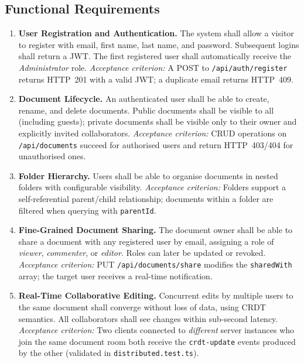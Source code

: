 \documentclass{scrartcl}
\begin{document}
  \subsection{Functional Requirements}

  \begin{enumerate}
    \item[\textbf{FR-1}] \textbf{User Registration and Authentication.}
    The system shall allow a visitor to register with email, first name, last name, and password.
    Subsequent logins shall return a JWT. The first registered user shall automatically receive
    the \textit{Administrator} role.
    \textit{Acceptance criterion:} A POST to \texttt{/api/auth/register} returns HTTP~201 with a
    valid JWT; a duplicate email returns HTTP~409.

    \item[\textbf{FR-2}] \textbf{Document Lifecycle.}
    An authenticated user shall be able to create, rename, and delete documents. Public documents
    shall be visible to all (including guests); private documents shall be visible only to their
    owner and explicitly invited collaborators.
    \textit{Acceptance criterion:} CRUD operations on \texttt{/api/documents} succeed for
    authorised users and return HTTP~403/404 for unauthorised ones.

    \item[\textbf{FR-3}] \textbf{Folder Hierarchy.}
    Users shall be able to organise documents in nested folders with configurable visibility.
    \textit{Acceptance criterion:} Folders support a self-referential parent/child relationship;
    documents within a folder are filtered when querying with \texttt{parentId}.

    \item[\textbf{FR-4}] \textbf{Fine-Grained Document Sharing.}
    The document owner shall be able to share a document with any registered user by email,
    assigning a role of \textit{viewer}, \textit{commenter}, or \textit{editor}. Roles can
    later be updated or revoked.
    \textit{Acceptance criterion:} PUT \texttt{/api/documents/share} modifies the
    \texttt{sharedWith} array; the target user receives a real-time notification.

    \item[\textbf{FR-5}] \textbf{Real-Time Collaborative Editing.}
    Concurrent edits by multiple users to the same document shall converge without loss of data,
    using CRDT semantics. All collaborators shall see changes within sub-second latency.
    \textit{Acceptance criterion:} Two clients connected to \emph{different} server instances who
    join the same document room both receive the \texttt{crdt-update} events produced by the
    other (validated in \texttt{distributed.test.ts}).


\end{enumerate}
\end{document}
